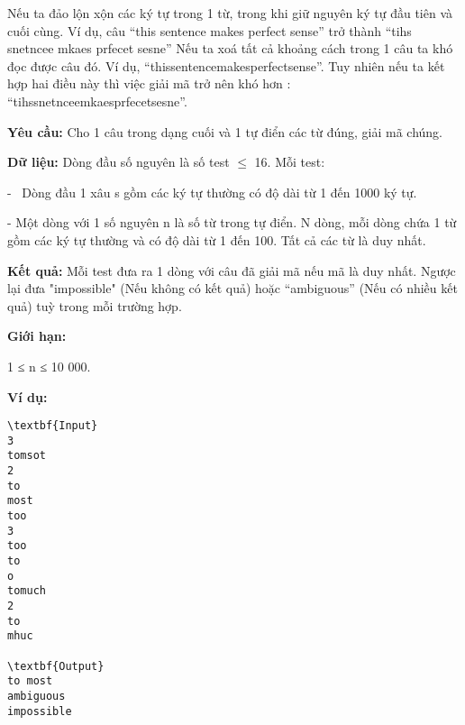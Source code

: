

Nếu ta đảo lộn xộn các ký tự trong 1 từ, trong khi giữ nguyên ký tự đầu tiên và cuối cùng. Ví dụ, câu “this sentence makes perfect sense” trở thành “tihs snetncee mkaes prfecet sesne” Nếu ta xoá tất cả khoảng cách trong 1 câu ta khó đọc được câu đó. Ví dụ, “thissentencemakesperfectsense”. Tuy nhiên nếu ta kết hợp hai điều này thì việc giải mã trở nên khó hơn : “tihssnetnceemkaesprfecetsesne”.

\textbf{Yêu cầu: } Cho 1 câu trong dạng cuối và 1 tự điển các từ đúng, giải mã chúng.

\textbf{Dữ liệu: } Dòng đầu số nguyên là số test  $\le$  16. Mỗi test:

-  Dòng đầu 1 xâu s gồm các ký tự thường có độ dài từ 1 đến 1000 ký tự.

- Một dòng với 1 số nguyên n là số từ trong tự điển. N dòng, mỗi dòng chứa 1 từ gồm các ký tự thường và có độ dài từ 1 đến 100. Tất cả các từ là duy nhất.

\textbf{Kết quả: } Mỗi test đưa ra 1 dòng với câu đã giải mã nếu mã là duy nhất. Ngược lại đưa "impossible" (Nếu không có kết quả) hoặc “ambiguous” (Nếu có nhiều kết quả) tuỳ trong mỗi trường hợp.

\textbf{Giới hạn: }

1 ≤ n ≤ 10 000.

\textbf{Ví dụ: }
\begin{verbatim}
\textbf{Input}
3
tomsot
2
to
most
too
3
too
to
o
tomuch
2
to
mhuc

\textbf{Output}
to most
ambiguous
impossible\end{verbatim}
